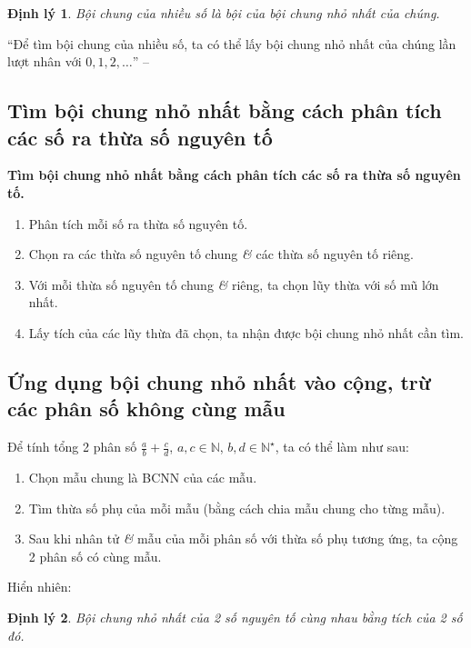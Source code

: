 \documentclass[oneside]{book}
\numberwithin{equation}{section}
\newtheorem{dinhly}{Định lý}[section]
\begin{document}
\begin{dinhly}
	Bội chung của nhiều số là bội của bội chung nhỏ nhất của chúng.
\end{dinhly}
``Để tìm bội chung của nhiều số, ta có thể lấy bội chung nhỏ nhất của chúng lần lượt nhân với $0,1,2,\ldots$'' -- \cite[p. 55]{Thai_Anh_Dat_Ha_Loan_Nam_Quang_Toan_6_tap_1}

\subsection{Tìm bội chung nhỏ nhất bằng cách phân tích các số ra thừa số nguyên tố}

\begin{tcolorbox}
	\textbf{Tìm bội chung nhỏ nhất bằng cách phân tích các số ra thừa số nguyên tố.}
	\begin{enumerate}
		\item Phân tích mỗi số ra thừa số nguyên tố.
		\item Chọn ra các thừa số nguyên tố chung \textit{\&} các thừa số nguyên tố riêng.
		\item Với mỗi thừa số nguyên tố chung \textit{\&} riêng, ta chọn lũy thừa với số mũ lớn nhất.
		\item Lấy tích của các lũy thừa đã chọn, ta nhận được bội chung nhỏ nhất cần tìm.
	\end{enumerate}
\end{tcolorbox}

\subsection{Ứng dụng bội chung nhỏ nhất vào cộng, trừ các phân số không cùng mẫu}

\begin{tcolorbox}
	Để tính tổng 2 phân số $\frac{a}{b} + \frac{c}{d}$, $a,c\in\mathbb{N}$, $b,d\in\mathbb{N}^\star$, ta có thể làm như sau:
	\begin{enumerate}
		\item Chọn mẫu chung là BCNN của các mẫu.
		\item Tìm thừa số phụ của mỗi mẫu (bằng cách chia mẫu chung cho từng mẫu).
		\item Sau khi nhân tử \textit{\&} mẫu của mỗi phân số với thừa số phụ tương ứng, ta cộng 2 phân số có cùng mẫu.
	\end{enumerate}
\end{tcolorbox}
Hiển nhiên:

\begin{dinhly}
	Bội chung nhỏ nhất của 2 số nguyên tố cùng nhau bằng tích của 2 số đó.
\end{dinhly}
\end{document}

